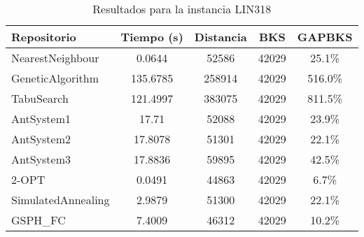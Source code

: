 \begin{table}[H]
\centering
\caption{Resultados para la instancia LIN318}
\begin{tabular}{|l|c|c|c|c|}
\hline
\textbf{Repositorio} & \textbf{Tiempo (s)} & \textbf{Distancia} & \textbf{BKS} & \textbf{GAPBKS} \\ 
\hline
NearestNeighbour & 0.0644 & 52586 & 42029 & 25.1\% \\ 
GeneticAlgorithm & 135.6785 & 258914 & 42029 & 516.0\% \\ 
TabuSearch & 121.4997 & 383075 & 42029 & 811.5\% \\ 
AntSystem1 & 17.71 & 52088 & 42029 & 23.9\% \\ 
AntSystem2 & 17.8078 & 51301 & 42029 & 22.1\% \\ 
AntSystem3 & 17.8836 & 59895 & 42029 & 42.5\% \\ 
2-OPT & 0.0491 & 44863 & 42029 & 6.7\% \\ 
SimulatedAnnealing & 2.9879 & 51300 & 42029 & 22.1\% \\ 
GSPH_FC & 7.4009 & 46312 & 42029 & 10.2\% \\ 
\hline
\end{tabular}
\end{table}
